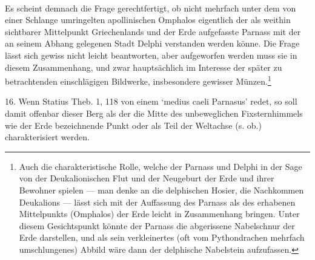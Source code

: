\documentclass[a4paper, 11pt, oneside]{article}
\begin{document}
\paragraph{}
Es scheint demnach die Frage gerechtfertigt, ob nicht mehrfach unter dem von einer Schlange umringelten apollinischen Omphalos eigentlich der als weithin sichtbarer Mittelpunkt Griechenlands und der Erde aufgefasste Parnass mit der an seinem Abhang gelegenen Stadt Delphi verstanden werden könne. Die Frage lässt sich gewiss nicht leicht beantworten, aber aufgeworfen werden muss sie in diesem Zusammenhang, und zwar hauptsächlich im Interesse der später zu betrachtenden einschlägigen Bildwerke, insbesondere gewisser Münzen.\footnote{Auch die charakteristische Rolle, welche der Parnass und Delphi in der Sage von der Deukalionischen Flut und der Neugeburt der Erde und ihrer Bewohner spielen --- man denke an die delphischen Hosier, die Nachkommen Deukalions --- lässt sich mit der Auffassung des Parnass als des erhabenen Mittelpunkts (Omphalos) der Erde leicht in Zusammenhang bringen. Unter diesem Gesichtspunkt könnte der Parnass die abgerissene Nabelschnur der Erde darstellen, und als sein verkleinertes (oft vom Pythondrachen mehrfach umschlungenes) Abbild wäre dann der delphische Nabelstein aufzufassen.}

16. Wenn Statius Theb. 1, 118 von einem `medius caeli Parnasus' redet, so soll damit offenbar dieser Berg als der die Mitte des unbeweglichen Fixsternhimmels wie der Erde bezeichnende Punkt oder als Teil der Weltachse (s. ob.) charakterisiert werden.
\end{document}

